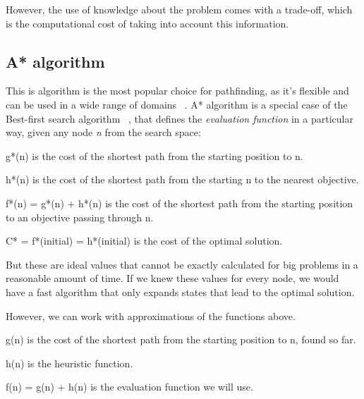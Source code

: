 \documentclass[runningheads]{llncs}
\begin{document}
However, the use of knowledge about the problem comes with a trade-off, which is the computational cost of taking into account this information.

\subsection{A* algorithm}
This is algorithm is the most popular choice for pathfinding, as it's flexible and can be used in a wide range 
of domains ~\cite{ref_url_a_stanford}.
A* algorithm is a special case of the Best-first search algorithm ~\cite{ref_url_bfs_washington,ref_url_bfs_wiki}, 
that defines the {\itshape evaluation function} in a particular way, given any node {\itshape n}
 from the search space:
 \begin{definition}
g*(n) is the cost of the shortest path from the starting position to n.
\end{definition}
 \begin{definition}
h*(n) is the cost of the shortest path from the starting n to the nearest objective.
\end{definition}
\begin{definition}
f*(n) = g*(n) + h*(n) is the cost of the shortest path from the starting position to an objective passing through n.
\end{definition}
\begin{definition}
C* = f*(initial) = h*(initial) is the cost of the optimal solution.
\end{definition}

But these are ideal values that cannot be exactly calculated for big problems in a reasonable amount of time.
If we knew these values for every node, we would have a fast algorithm that only expands states that lead to the optimal solution.

However, we can work with approximations of the functions above.
 \begin{definition}
g(n) is the cost of the shortest path from the starting position to n, found so far.  
\end{definition}
 \begin{definition}
h(n) is the heuristic function.
\end{definition}
\begin{definition}
f(n) = g(n) + h(n) is the evaluation function we will use.
\end{definition}
\end{document}
